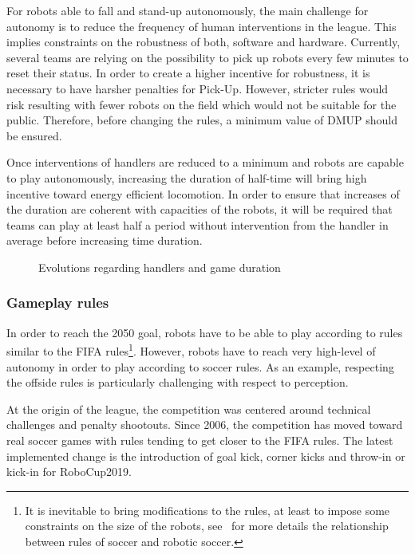\documentclass{article}
\begin{document}
For robots able to fall and stand-up autonomously,
the main challenge for autonomy is to reduce the frequency of human interventions in the league.
This implies constraints on the robustness of both, software and hardware.
Currently, several teams are relying on the possibility to pick up robots every few minutes
to reset their status.
In order to create a higher incentive for robustness, it is necessary to have harsher penalties
for Pick-Up.
However, stricter rules would risk resulting with fewer robots on the field which would not be
suitable for the public.
Therefore, before changing the rules, a minimum value of DMUP should be ensured.

Once interventions of handlers are reduced to a minimum and robots are capable to play autonomously,
increasing the duration of half-time will bring high incentive toward energy efficient locomotion.
In order to ensure that increases of the duration are coherent with capacities of the robots,
it will be required that teams can play at least half a period without intervention
from the handler in average before increasing time duration.

\begin{figure}
  \centering
  
  \caption{\label{fig:handlers+game_duration}Evolutions regarding handlers and game duration}
\end{figure}

\subsubsection{Gameplay rules}
In order to reach the 2050 goal, robots have to be able to play according to
rules similar to the FIFA rules\footnote{It is inevitable to bring modifications
  to the rules, at least to impose some constraints on the size of the robots,
  see~\cite{Stone2010} for more details the relationship between rules of soccer
  and robotic soccer.}.
However, robots have to reach very high-level of autonomy in order to play according to soccer rules.
As an example, respecting the offside rules is particularly challenging with respect to perception.

At the origin of the league,
the competition was centered around technical challenges and penalty shootouts.
Since 2006, the competition has moved toward real soccer games with rules tending
to get closer to the FIFA rules.
The latest implemented change is the introduction of goal kick, corner kicks and
throw-in or kick-in for RoboCup2019.
\end{document}
